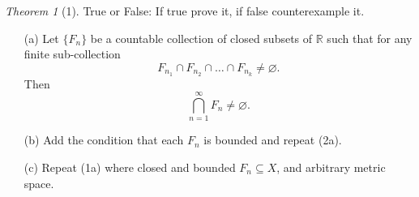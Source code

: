 \documentclass[12pt]{article}
\theoremstyle{remark}
\theoremstyle{named}
\newtheorem*{theorem}{Theorem}
\begin{document}
\begin{theorem}[1]
    True or False: If true prove it, if false counterexample it.
    \begin{enumerate}
        \item [(a)] Let \(\{F_n\}\) be a countable collection of closed subsets of \(\mathbb R\) such that for any finite sub-collection 
        \[F_{n_1} \cap F_{n_2} \cap \dots \cap F_{n_k} \neq \varnothing.\]
        Then 
        \[\bigcap_{n = 1}^\infty F_n \neq \varnothing.\]
        \item [(b)] Add the condition that each \(F_n\) is bounded and repeat (2a).
        \item [(c)] Repeat (1a) where closed and bounded \(F_n \subseteq X\), and arbitrary metric space.
    \end{enumerate}
\end{theorem}
\end{document}
